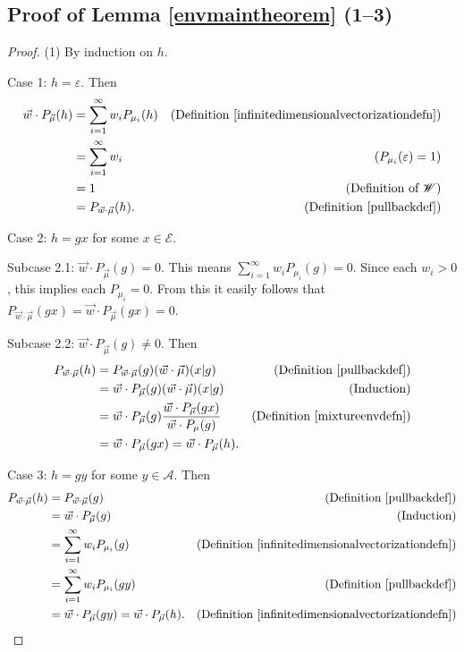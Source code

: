 \documentclass[twoside]{article}
\begin{document}
\subsection{Proof of Lemma \ref{envmaintheorem} (1--3)}
\begin{proof}
    (1) By induction on $h$.

    Case 1: $h=\varepsilon$. Then
    \begin{align*}
        \vec w\cdot P_{\vec\mu}(h)
        &= \sum_{i=1}^\infty w_i P_{\mu_i}(h)
            &\mbox{(Definition \ref{infinitedimensionalvectorizationdefn})}\\
        &= \sum_{i=1}^\infty w_i
            &\mbox{($P_{\mu_i}(\varepsilon)=1$)}\\
        &= 1
            &\mbox{(Definition of $\mathscr W$)}\\
        &= P_{\vec w\cdot \vec\mu}(h).
            &\mbox{(Definition \ref{pullbackdef})}
    \end{align*}

    Case 2: $h=gx$ for some $x\in\mathcal E$.

    Subcase 2.1: $\vec w\cdot P_{\vec\mu}(g)=0$.
        This means $\sum_{i=1}^\infty w_i P_{\mu_i}(g)=0$.
        Since each $w_i>0$, this implies each $P_{\mu_i}=0$.
        From this it easily follows that
        $P_{\vec w\cdot \vec\mu}(gx)=\vec w\cdot P_{\vec\mu}(gx)=0$.

    Subcase 2.2: $\vec w\cdot P_{\vec\mu}(g)\not=0$. Then
    \begin{align*}
        P_{\vec w\cdot \vec\mu}(h)
            &= P_{\vec w\cdot \vec\mu}(g)(\vec w\cdot\vec\mu)(x|g)
                &\mbox{(Definition \ref{pullbackdef})}\\
            &= \vec w\cdot P_{\vec\mu}(g)(\vec w\cdot\vec\mu)(x|g)
                &\mbox{(Induction)}\\
            &= \vec w\cdot P_{\vec\mu}(g)
                \frac{\vec w\cdot P_{\vec\mu}(gx)}{\vec w\cdot P_{\mu}(g)}
                &\mbox{(Definition \ref{mixtureenvdefn})}\\
            &= \vec w\cdot P_{\vec\mu}(gx) = \vec w\cdot P_{\vec\mu}(h).
    \end{align*}

    Case 3: $h=gy$ for some $y\in\mathcal A$.
    Then
    \begin{align*}
        P_{\vec w\cdot \vec\mu}(h)
            &= P_{\vec w\cdot \vec\mu}(g)
                &\mbox{(Definition \ref{pullbackdef})}\\
            &= \vec w\cdot P_{\vec\mu}(g)
                &\mbox{(Induction)}\\
            &= \sum_{i=1}^\infty w_i P_{\mu_i}(g)
                &\mbox{(Definition \ref{infinitedimensionalvectorizationdefn})}\\
            &= \sum_{i=1}^\infty w_i P_{\mu_i}(gy)
                &\mbox{(Definition \ref{pullbackdef})}\\
            &= \vec w\cdot P_{\vec\mu}(gy) = \vec w\cdot P_{\vec\mu}(h).
                &\mbox{(Definition \ref{infinitedimensionalvectorizationdefn})}
    \end{align*}


\end{proof}
\end{document}
